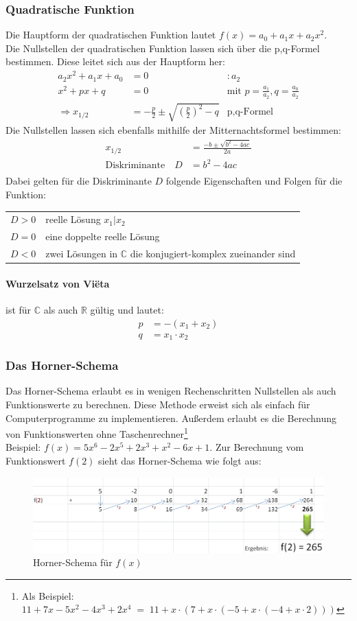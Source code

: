 \subsubsection{Quadratische Funktion}
Die Hauptform der quadratischen Funktion lautet $f(x) = a_0 + a_1 x + a_2 x^2$.\\
Die Nullstellen der quadratischen Funktion lassen sich über die p,q-Formel bestimmen. Diese leitet sich aus der Hauptform her:
\begin{align*}
a_2 x^2 + a_1 x + a_0 &= 0 &:a_2\\
x^2 + p x + q &= 0 &\text{mit $p = \frac{a_1}{a_2}, q = \frac{a_0}{a_2}$}\\
\Rightarrow x_{1/2} &= - \frac{p}{2} \pm \sqrt{(\frac{p}{2})^2 - q} &\text{p,q-Formel}
\end{align*}
Die Nullstellen lassen sich ebenfalls mithilfe der Mitternachtsformel bestimmen:
\begin{align*}
x_{1/2} &= \frac{-b \pm \sqrt{b^2 - 4ac}}{2a}\\
\text{Diskriminante} \quad D &= b^2 - 4ac\\
\end{align*}
Dabei gelten für die Diskriminante $D$ folgende Eigenschaften und Folgen für die Funktion:
\begin{tabular}{c l}
$D>0$ & reelle Lösung $x_1 | x_2$ \\
$D=0$ & eine doppelte reelle Lösung\\
$D<0$ & zwei Lösungen in $\mathbb{C}$ die konjugiert-komplex zueinander sind\\
\end{tabular}
\paragraph{Wurzelsatz von Vi\"{e}ta} ist für $\mathbb{C}$ als auch $\mathbb{R}$ gültig und lautet:
\begin{align*}
p &= -(x_1 + x_2)\\
q &= x_1 \cdot x_2
\end{align*}
\subsubsection{Das Horner-Schema} 
Das Horner-Schema erlaubt es in wenigen Rechenschritten Nullstellen als auch Funktionswerte zu berechnen. Diese Methode erweist sich als einfach für Computerprogramme zu implementieren. Außerdem erlaubt es die Berechnung von Funktionswerten ohne Taschenrechner\footnote{ Als Beispiel:
$11 + 7x - 5x^2 -4x^3 + 2x^4 \;=\; 11 + x \cdot\left(7 + x \cdot(-5 + x \cdot(-4 + x \cdot 2))\right)$}\\
Beispiel: $f(x) = 5x^6 - 2x^5 + 2x^3 + x^2 - 6x +1$. Zur Berechnung vom Funktionswert $f(2)$ sieht das Horner-Schema wie folgt aus:\\

\begin{figure}[!ht]
\caption{Horner-Schema für $f(x)$}
\centering
\includegraphics[scale=0.55]{img/img1}
\end{figure}


